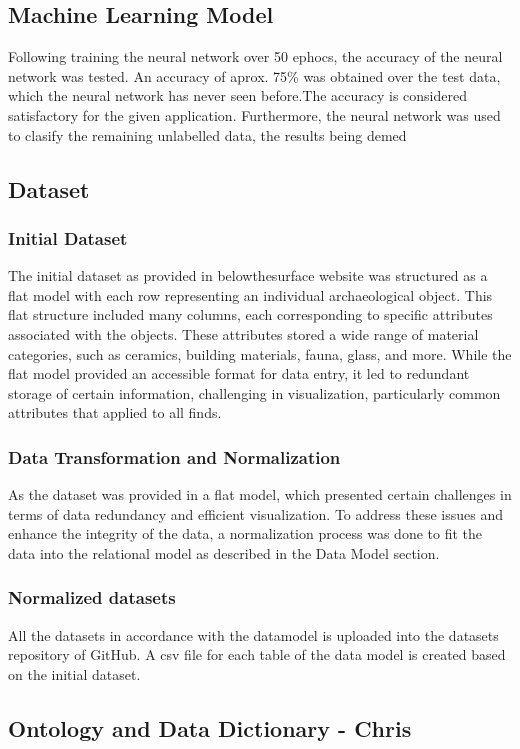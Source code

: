 \subsection{Machine Learning Model}
Following training the neural network over 50 ephocs, the accuracy of the neural network was tested. An accuracy of aprox. 75\% was obtained over the test data, which the neural network has never seen before.The accuracy is considered satisfactory for the given application. Furthermore, the neural network was used to clasify the remaining unlabelled data, the results being demed

\subsection{Dataset}

\subsubsection{Initial Dataset}
The initial dataset as provided in belowthesurface website was structured as a flat model with each row representing an individual archaeological object. This flat structure included many columns, each corresponding to specific attributes associated with the objects. These attributes stored a wide range of material categories, such as ceramics, building materials, fauna, glass, and more. While the flat model provided an accessible format for data entry, it led to redundant storage of certain information, challenging in visualization, particularly common attributes that applied to all finds.

\subsubsection{Data Transformation and Normalization}
As the dataset was provided in a flat model, which presented certain challenges in terms of data redundancy and efficient visualization. To address these issues and enhance the integrity of the data, a normalization process was done to fit the data into the relational model as described in the Data Model section.

\subsubsection{Normalized datasets}
All the datasets in accordance with the datamodel is uploaded into the datasets repository of GitHub. A csv file for each table of the data model is created based on the initial dataset.

\subsection{Ontology and Data Dictionary - Chris}

